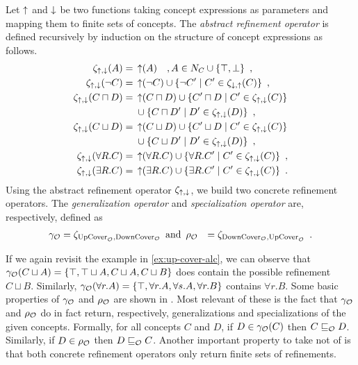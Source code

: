 \begin{definition}
  Let $\operatorname{\uparrow}$ and $\operatorname{\downarrow}$ be two functions taking concept expressions as parameters and mapping them to finite sets of concepts.
  The \emph{abstract refinement operator} is defined recursively by induction on the structure of concept expressions as follows.
  \begin{align*}
    \zeta_{\operatorname{\uparrow},\operatorname{\downarrow}}(A) ={} & \operatorname{\uparrow}(A) \quad, A \in N_C \cup \{\top, \bot\} \enspace, \\
    \zeta_{\operatorname{\uparrow},\operatorname{\downarrow}}(\lnot C) ={} & \operatorname{\uparrow}(\lnot C) \cup \{ \lnot C' \mid C' \in \zeta_{\operatorname{\downarrow},\operatorname{\uparrow}}(C) \} \enspace, \\
    \zeta_{\operatorname{\uparrow},\operatorname{\downarrow}}(C \sqcap D) ={} & \operatorname{\uparrow}(C \sqcap D) \cup \{ C' \sqcap D \mid C' \in \zeta_{\operatorname{\uparrow},\operatorname{\downarrow}}(C) \} \\
    & \cup \{ C \sqcap D' \mid D' \in \zeta_{\operatorname{\uparrow},\operatorname{\downarrow}}(D) \} \enspace, \\
    \zeta_{\operatorname{\uparrow},\operatorname{\downarrow}}(C \sqcup D) ={} & \operatorname{\uparrow}(C \sqcup D) \cup \{ C' \sqcup D \mid C' \in \zeta_{\operatorname{\uparrow},\operatorname{\downarrow}}(C) \} \\
    & \cup \{ C \sqcup D' \mid D' \in \zeta_{\operatorname{\uparrow},\operatorname{\downarrow}}(D) \} \enspace, \\
    \zeta_{\operatorname{\uparrow},\operatorname{\downarrow}}(\forall R.C) ={} & \operatorname{\uparrow}(\forall R.C)
    \cup \{ \forall R.C' \mid C' \in \zeta_{\operatorname{\uparrow},\operatorname{\downarrow}}(C) \} \enspace, \\
    \zeta_{\operatorname{\uparrow},\operatorname{\downarrow}}(\exists R.C) ={} & \operatorname{\uparrow}(\exists R.C)
    \cup \{ \exists R.C' \mid C' \in \zeta_{\operatorname{\uparrow},\operatorname{\downarrow}}(C) \} \enspace.
  \end{align*}
  Using the abstract refinement operator $\zeta_{\operatorname{\uparrow},\operatorname{\downarrow}}$, we build two concrete refinement operators. The \emph{generalization operator} and \emph{specialization operator} are, respectively, defined as
  \begin{align*}
    \gamma_\mathcal{O} &= \zeta_{{\operatorname{UpCover}}_\mathcal{O},{\operatorname{DownCover}}_\mathcal{O}} \enspace \text{and} \enspace
    \rho_\mathcal{O} &= \zeta_{{\operatorname{DownCover}}_\mathcal{O},{\operatorname{UpCover}}_\mathcal{O}} \enspace.
  \end{align*}
\end{definition}

If we again revisit the example in \cref{ex:up-cover-alc}, we can observe that $\gamma_\mathcal{O}(C \sqcup A) = \{ \top, \top \sqcup A, C \sqcup A, C \sqcup B \}$ does contain the possible refinement $C \sqcup B$. Similarly, $\gamma_\mathcal{O}(\forall r.A) = \{ \top, \forall r.A, \forall s.A, \forall r.B \}$ contains $\forall r.B$. Some basic properties of $\gamma_\mathcal{O}$ and $\rho_\mathcal{O}$ are shown in \cite{troquard2018repairing}. Most relevant of these is the fact that $\gamma_\mathcal{O}$ and $\rho_\mathcal{O}$ do in fact return, respectively, generalizations and specializations of the given concepts. Formally, for all concepts $C$ and $D$, if $D \in \gamma_\mathcal{O}(C)$ then $C \sqsubseteq_\mathcal{O} D$. Similarly, if $D \in \rho_\mathcal{O}$ then $D \sqsubseteq_\mathcal{O} C$. Another important property to take not of is that both concrete refinement operators only return finite sets of refinements.

